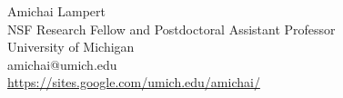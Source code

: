 \documentclass{daj}
\begin{document}

\begin{dajauthors}
\begin{authorinfo}[AL]
  Amichai Lampert\\
  NSF Research Fellow and Postdoctoral Assistant Professor \\
  University of Michigan\\
  amichai@umich.edu \\
\url{https://sites.google.com/umich.edu/amichai/}
\end{authorinfo}
\end{dajauthors}
\end{document}
